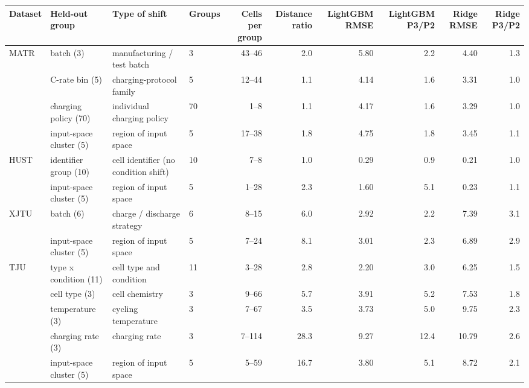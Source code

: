 \begin{tabular}{llllrrrrrr}
\toprule
Dataset & Held-out group & Type of shift & Groups & Cells per group & Distance ratio & LightGBM RMSE & LightGBM P3/P2 & Ridge RMSE & Ridge P3/P2 \\
\midrule
MATR & batch (3) & manufacturing / test batch & 3 & 43--46 & 2.0 & 5.80 & 2.2 & 4.40 & 1.3 \\
 & C-rate bin (5) & charging-protocol family & 5 & 12--44 & 1.1 & 4.14 & 1.6 & 3.31 & 1.0 \\
 & charging policy (70) & individual charging policy & 70 & 1--8 & 1.1 & 4.17 & 1.6 & 3.29 & 1.0 \\
 & input-space cluster (5) & region of input space & 5 & 17--38 & 1.8 & 4.75 & 1.8 & 3.45 & 1.1 \\
HUST & identifier group (10) & cell identifier (no condition shift) & 10 & 7--8 & 1.0 & 0.29 & 0.9 & 0.21 & 1.0 \\
 & input-space cluster (5) & region of input space & 5 & 1--28 & 2.3 & 1.60 & 5.1 & 0.23 & 1.1 \\
XJTU & batch (6) & charge / discharge strategy & 6 & 8--15 & 6.0 & 2.92 & 2.2 & 7.39 & 3.1 \\
 & input-space cluster (5) & region of input space & 5 & 7--24 & 8.1 & 3.01 & 2.3 & 6.89 & 2.9 \\
TJU & type x condition (11) & cell type and condition & 11 & 3--28 & 2.8 & 2.20 & 3.0 & 6.25 & 1.5 \\
 & cell type (3) & cell chemistry & 3 & 9--66 & 5.7 & 3.91 & 5.2 & 7.53 & 1.8 \\
 & temperature (3) & cycling temperature & 3 & 7--67 & 3.5 & 3.73 & 5.0 & 9.75 & 2.3 \\
 & charging rate (3) & charging rate & 3 & 7--114 & 28.3 & 9.27 & 12.4 & 10.79 & 2.6 \\
 & input-space cluster (5) & region of input space & 5 & 5--59 & 16.7 & 3.80 & 5.1 & 8.72 & 2.1 \\
\bottomrule
\end{tabular}
